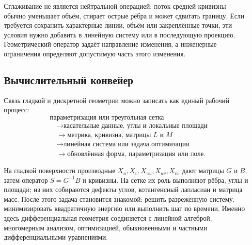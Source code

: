 Сглаживание не является нейтральной операцией: поток средней кривизны обычно уменьшает объём, стирает острые рёбра и может сдвигать границу. Если требуется сохранить характерные линии, объём или закреплённые точки, эти условия нужно добавить в линейную систему или в последующую проекцию. Геометрический оператор задаёт направление изменения, а инженерные ограничения определяют допустимую часть этого изменения.

\subsection{Вычислительный конвейер}

Связь гладкой и дискретной геометрии можно записать как единый рабочий процесс:
\begin{equation}
\label{eq:geometry-processing-pipeline}
\boxed{
\begin{aligned}
&\text{параметризация или треугольная сетка}
\\[-0.2em]
&\quad\longrightarrow
\text{касательные данные, углы и локальные площади}
\\[-0.2em]
&\quad\longrightarrow
\text{метрика, кривизна, матрицы }L\text{ и }M
\\[-0.2em]
&\quad\longrightarrow
\text{линейная система или задача оптимизации}
\\[-0.2em]
&\quad\longrightarrow
\text{обновлённая форма, параметризация или поле}.
\end{aligned}
}
\end{equation}

На гладкой поверхности производные \(X_u,X_v,X_{uu},X_{uv},X_{vv}\) дают матрицы \(G\) и \(B\), затем оператор \(S=G^{-1}B\) и кривизны. На сетке их роль выполняют рёбра, углы и площади; из них собираются дефекты углов, котангенсный лапласиан и матрица масс. После этого задача становится знакомой: решить разреженную систему, минимизировать квадратичную энергию или выполнить шаг по времени. Именно здесь дифференциальная геометрия соединяется с линейной алгеброй, многомерным анализом, оптимизацией, обыкновенными и частными дифференциальными уравнениями.
